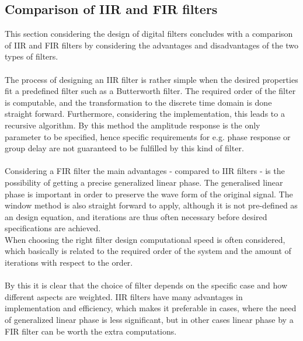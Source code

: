 \subsection{Comparison of IIR and FIR filters}
This section considering the design of digital filters concludes with a comparison of IIR and FIR filters by considering the advantages and disadvantages of the two types of filters.
\\ \\
The process of designing an IIR filter is rather simple when the desired properties fit a predefined filter such as a Butterworth filter. The required order of the filter is computable, and the transformation to the discrete time domain is done straight forward. Furthermore, considering the implementation, this leads to a recursive algorithm. By this method the amplitude response is the only parameter to be specified, hence specific requirements for e.g. phase response or group delay are not guaranteed to be fulfilled by this kind of filter. \\ \\
Considering a FIR filter the main advantages - compared to IIR filters - is the possibility of getting a precise generalized linear phase. The generalised linear phase is important in order to preserve the wave form of the original signal.  
The window method is also straight forward to apply, although it is not pre-defined as an design equation, and iterations are thus often necessary before desired specifications are achieved. \\
When choosing the right filter design computational speed is often considered, which basically is related to the required order of the system and the amount of iterations with respect to the order. \\
\\
By this it is clear that the choice of filter depends on the specific case and how different aspects are weighted. IIR filters have many advantages in implementation and efficiency, which makes it preferable in cases, where the need of generalized linear phase is less significant, but in other cases linear phase by a FIR filter can be worth the extra computations.